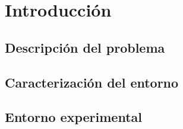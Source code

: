 \section{Introducción}

\subsection{Descripción del problema}
\subsection{Caracterización del entorno}
\subsection{Entorno experimental}
